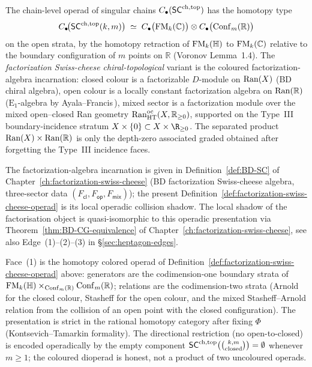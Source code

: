 \begin{definition}
The chain-level operad of singular chains $C_\bullet(\mathsf{SC}^{\mathrm{ch},\mathrm{top}})$ has
the homotopy type
\begin{equation}\label{eq:scchtop-arity-decomp}
 C_\bullet\!\bigl(\mathsf{SC}^{\mathrm{ch},\mathrm{top}}(k,m)\bigr)
 \;\simeq\;
 C_\bullet\bigl(\mathrm{FM}_k(\mathbb{C})\bigr)\otimes
 C_\bullet\bigl(\mathrm{Conf}_m(\mathbb{R})\bigr)
\end{equation}
on the open strata, by the homotopy retraction of $\mathrm{FM}_k(\mathbb{H})$
to $\mathrm{FM}_k(\mathbb{C})$ relative to the boundary configuration of $m$
points on $\mathbb{R}$ (Voronov\,\cite{Voronov1998}\,Lemma~1.4). The
\emph{factorization Swiss-cheese chiral-topological} variant is the
coloured factorization-algebra incarnation: closed colour is a
factorizable $D$-module on $\mathrm{Ran}(X)$ (BD chiral algebra), open colour
is a locally constant factorization algebra on $\mathrm{Ran}(\mathbb{R})$
($\mathrm{E}_1$-algebra by Ayala--Francis\,\cite{AF15}), mixed sector
is a factorization module over the mixed open--closed Ran geometry
$\mathrm{Ran}^{\mathrm{oc}}_{\mathrm{HT}}(X,\mathbb{R}_{\geq 0})$, supported
on the Type~III boundary-incidence stratum
$X\times\{0\}\subset X\times\R_{\geq 0}$. The separated product
$\mathrm{Ran}(X)\times\mathrm{Ran}(\mathbb{R})$ is only the depth-zero associated
graded obtained after forgetting the Type~III incidence faces.
\end{definition}

\begin{remark}
\label{rem:def-fsc-pointer}
The factorization-algebra incarnation is given in
Definition~\ref{def:BD-SC} of
Chapter~\ref{ch:factorization-swiss-cheese} (BD factorization
Swiss-cheese algebra, three-sector data $(F_{\mathsf{cl}},
F_{\mathsf{op}},F_{\mathsf{mix}})$); the present
Definition~\ref{def:factorization-swiss-cheese-operad} is its local
operadic collision shadow. The local shadow of the factorisation
object is quasi-isomorphic to this operadic presentation via
Theorem~\ref{thm:BD-CG-equivalence} of
Chapter~\ref{ch:factorization-swiss-cheese}, see also
Edge~(1)--(2)--(3) in \S\ref{sec:heptagon-edges}.
\end{remark}

Face~(1) is the homotopy colored operad of
Definition~\ref{def:factorization-swiss-cheese-operad} above:
generators are the codimension-one boundary strata of
$\mathrm{FM}_k(\mathbb{H})\times_{\mathrm{Conf}_m(\mathbb{R})}\mathrm{Conf}_m(\mathbb{R})$;
relations are the codimension-two strata (Arnold for the closed
colour, Stasheff for the open colour, and the mixed Stasheff--Arnold
relation from the collision of an open point with the closed
configuration). The presentation is strict in the rational homotopy
category after fixing $\Phi$ (Kontsevich--Tamarkin formality).
The directional restriction (no open-to-closed) is encoded
operadically by the empty component
$\mathsf{SC}^{\mathrm{ch},\mathrm{top}}\bigl(\binom{k,m}{\text{closed}}\bigr)=\emptyset$ whenever
$m\geq 1$; the coloured dioperad is honest, not a product of two
uncoloured operads.

